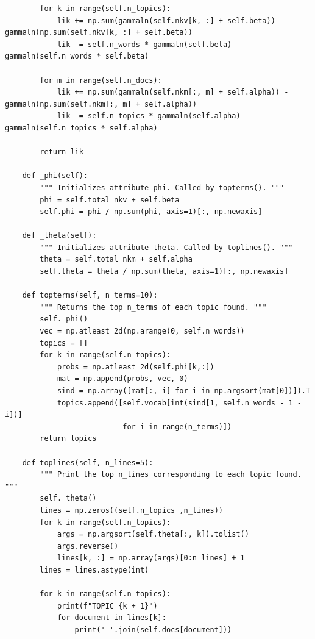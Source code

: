 \begin{lstlisting}
        for k in range(self.n_topics):
            lik += np.sum(gammaln(self.nkv[k, :] + self.beta)) - gammaln(np.sum(self.nkv[k, :] + self.beta))
            lik -= self.n_words * gammaln(self.beta) - gammaln(self.n_words * self.beta)

        for m in range(self.n_docs):
            lik += np.sum(gammaln(self.nkm[:, m] + self.alpha)) - gammaln(np.sum(self.nkm[:, m] + self.alpha))
            lik -= self.n_topics * gammaln(self.alpha) - gammaln(self.n_topics * self.alpha)

        return lik

    def _phi(self):
        """ Initializes attribute phi. Called by topterms(). """
        phi = self.total_nkv + self.beta
        self.phi = phi / np.sum(phi, axis=1)[:, np.newaxis]

    def _theta(self):
        """ Initializes attribute theta. Called by toplines(). """
        theta = self.total_nkm + self.alpha
        self.theta = theta / np.sum(theta, axis=1)[:, np.newaxis]

    def topterms(self, n_terms=10):
        """ Returns the top n_terms of each topic found. """
        self._phi()
        vec = np.atleast_2d(np.arange(0, self.n_words))
        topics = []
        for k in range(self.n_topics):
            probs = np.atleast_2d(self.phi[k,:])
            mat = np.append(probs, vec, 0)
            sind = np.array([mat[:, i] for i in np.argsort(mat[0])]).T
            topics.append([self.vocab[int(sind[1, self.n_words - 1 - i])]
                           for i in range(n_terms)])
        return topics

    def toplines(self, n_lines=5):
        """ Print the top n_lines corresponding to each topic found. """
        self._theta()
        lines = np.zeros((self.n_topics ,n_lines))
        for k in range(self.n_topics):
            args = np.argsort(self.theta[:, k]).tolist()
            args.reverse()
            lines[k, :] = np.array(args)[0:n_lines] + 1
        lines = lines.astype(int)

        for k in range(self.n_topics):
            print(f"TOPIC {k + 1}")
            for document in lines[k]:
                print(' '.join(self.docs[document]))

\end{lstlisting}
